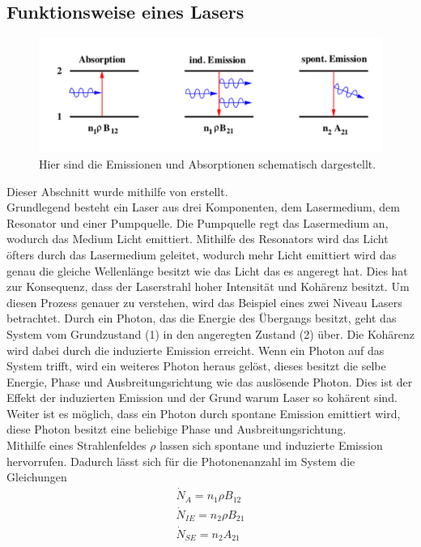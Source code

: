 \subsection{Funktionsweise eines Lasers}
\begin{figure}[b!]
	\centering
	\includegraphics[width = \textwidth]{../Grafiken/Emission.pdf}
	\caption{Hier sind die Emissionen und Absorptionen schematisch dargestellt.\cite{V61}}
\end{figure}
Dieser Abschnitt wurde mithilfe von \cite{V61} erstellt.\\
Grundlegend besteht ein Laser aus drei Komponenten, dem Lasermedium, dem Resonator und einer Pumpquelle.
Die Pumpquelle regt das Lasermedium an, wodurch das Medium Licht emittiert.
Mithilfe des Resonators wird das Licht öfters durch das Lasermedium geleitet, wodurch mehr Licht emittiert wird das genau die gleiche Wellenlänge besitzt wie das Licht das es angeregt hat.
Dies hat zur Konsequenz, dass der Laserstrahl hoher Intensität und  Kohärenz besitzt.
Um diesen Prozess genauer zu verstehen, wird das Beispiel eines zwei Niveau Lasers betrachtet.
Durch ein Photon, das die Energie des Übergangs besitzt, geht das System vom Grundzustand (1) in den angeregten Zustand (2) über.
Die Kohärenz wird dabei durch die induzierte Emission erreicht.
Wenn ein Photon auf das System  trifft, wird ein weiteres Photon heraus gelöst, dieses besitzt die selbe Energie, Phase und Ausbreitungsrichtung wie das auslösende Photon.
Dies ist der Effekt der induzierten Emission und der Grund warum Laser so kohärent sind.
Weiter ist es möglich, dass ein Photon durch spontane Emission emittiert wird, diese Photon besitzt eine beliebige Phase und Ausbreitungsrichtung.\\
Mithilfe eines Strahlenfeldes $\rho$ lassen sich spontane und induzierte Emission hervorrufen.
Dadurch lässt sich für die Photonenanzahl im System die Gleichungen
\begin{align}
	\dot{N}_A=n_1\rho B_{12}\\
	\dot{N}_{IE}=n_2\rho B_{21}\\
	\dot{N}_{SE}=n_2A_{21}
\end{align}
